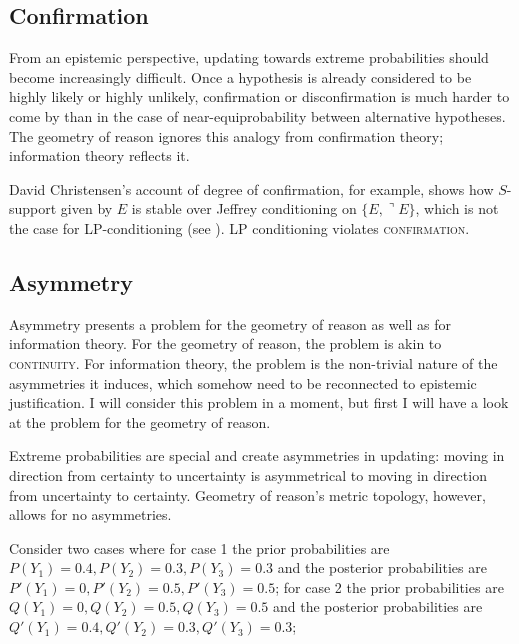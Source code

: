 \documentclass[11pt]{article} \usepackage{october} \onehalfspacing
\begin{document}
\subsection{Confirmation}
\label{Confirmation}

From an epistemic perspective, updating towards extreme probabilities
should become increasingly difficult. Once a hypothesis is already
considered to be highly likely or highly unlikely, confirmation or
disconfirmation is much harder to come by than in the case of
near-equiprobability between alternative hypotheses. The geometry of
reason ignores this analogy from confirmation theory; information
theory reflects it.

David Christensen's account of degree of confirmation, for example,
shows how $S$-support given by $E$ is stable over Jeffrey conditioning
on $\{E,\urcorner{}E\}$, which is not the case for LP-conditioning
(see ). LP conditioning violates
\textsc{confirmation}.

\subsection{Asymmetry}
\label{Asymmetry}

Asymmetry presents a problem for the geometry of reason as well as for
information theory. For the geometry of reason, the problem is akin to
\textsc{continuity}. For information theory, the problem is the
non-trivial nature of the asymmetries it induces, which somehow need
to be reconnected to epistemic justification. I will consider this
problem in a moment, but first I will have a look at the problem for
the geometry of reason.

Extreme probabilities are special and create asymmetries in updating:
moving in direction from certainty to uncertainty is asymmetrical to
moving in direction from uncertainty to certainty. Geometry of
reason's metric topology, however, allows for no asymmetries.

\begin{quotex}
  \label{ex:extreme} Consider two cases
  where for case 1 the prior probabilities are
  $P(Y_{1})=0.4,P(Y_{2})=0.3,P(Y_{3})=0.3$ and the posterior
  probabilities are $P'(Y_{1})=0,P'(Y_{2})=0.5,P'(Y_{3})=0.5$; for
  case 2 the prior probabilities are
  $Q(Y_{1})=0,Q(Y_{2})=0.5,Q(Y_{3})=0.5$ and the posterior
  probabilities are $Q'(Y_{1})=0.4,Q'(Y_{2})=0.3,Q'(Y_{3})=0.3$;
\end{quotex}
\end{document}
